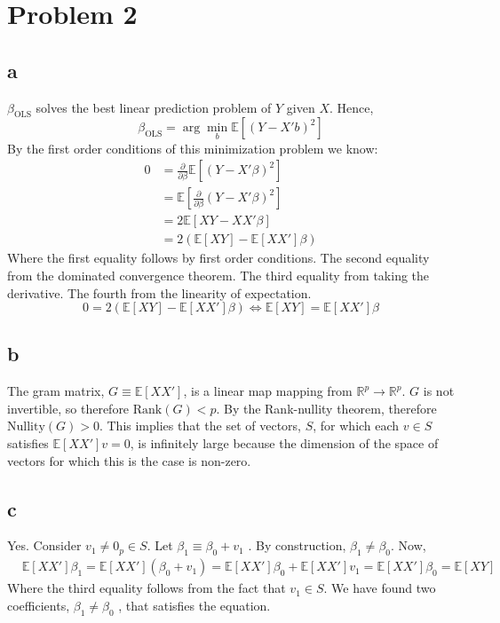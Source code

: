 \documentclass[12pt,notitlepage]{article}
\newcommand{\E}{\mathbb{E}}
\newcommand{\R}{\mathbb{R}}
\begin{document}
\section*{Problem 2}	
\subsection*{a}
$\beta_{\text{OLS}}$ solves the best linear prediction problem of $Y$ given $X$. Hence, 
\begin{equation*}
    \beta_{\text{OLS}} = \arg\min_{b}\E[(Y-X'b)^2]
\end{equation*}
By the first order conditions of this minimization problem we know:
\begin{align*}
    0 &= \frac{\partial}{\partial \beta} \E[(Y-X'\beta)^2] \\
    &= \E[\frac{\partial}{\partial \beta} (Y-X'\beta)^2] \\
    &= 2\E[XY-XX'\beta] \\
    &= 2(\E[XY]-\E[XX']\beta)
\end{align*}
Where the first equality follows by first order conditions. The second equality from the dominated convergence theorem. The third equality from taking the derivative. The fourth from the linearity of expectation.
\begin{equation*}
    0 = 2(\E[XY]-\E[XX']\beta) \iff \E[XY] = \E[XX']\beta
\end{equation*}
\subsection*{b}
The gram matrix, $G \equiv \E[XX']$, is a linear map mapping from $\R^p \to \R^p$. $G$ is not invertible, so therefore $\text{Rank}(G) < p$. By the Rank-nullity theorem, therefore $\text{Nullity}(G) > 0$. This implies that the set of vectors, $S$, for which each $v \in S$ satisfies $\E[XX']v = 0$, is infinitely large because the dimension of the space of vectors for which this is the case is non-zero. 
\subsection*{c}
Yes. Consider $v_1 \neq 0_p \in S$. Let $\beta_1 \equiv \beta_0 + v_1$ . By construction, $\beta_1 \neq \beta_0$. Now,
\begin{align*}
    &\E[XX']\beta_1 = \E[XX'](\beta_0 + v_1) = \E[XX']\beta_0 + \E[XX']v_1 = \E[XX']\beta_0 = \E[XY]
\end{align*}
Where the third equality follows from the fact that $v_1 \in S$. We have found two coefficients, $\beta_1 \neq \beta_0$ , that satisfies the equation.
\end{document}
